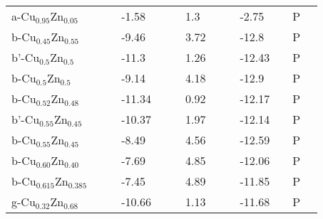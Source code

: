 \begin{landscape}
\begin{center}
\begin{longtable}{|l|p{2.5cm}|l|p{2.5cm}|l|l|p{2.5cm}|l|l|p{2.5cm}|l|l|l|}
a-Cu$_{0.95}$Zn$_{0.05 }$   &            &                     & -1.58   &  & \citep{KubaschewskiCatterallJohnAshley.1956} & 1.3    &  & \citep{KubaschewskiCatterallJohnAshley.1956} & -2.75   &  & P                    \\
b-Cu$_{0.45}$Zn$_{0.55 }$   &            &                     & -9.46   &  & \citep{KubaschewskiCatterallJohnAshley.1956} & 3.72   &  & \citep{KubaschewskiCatterallJohnAshley.1956} & -12.8   &  & P                    \\
b'-Cu$_{0.5}$Zn$_{0.5 }$    &            &                     & -11.3   &  & \citep{KubaschewskiCatterallJohnAshley.1956} & 1.26   &  & \citep{KubaschewskiCatterallJohnAshley.1956} & -12.43  &  & P                    \\
b-Cu$_{0.5}$Zn$_{0.5 }$     &            &                     & -9.14   &  & \citep{KubaschewskiCatterallJohnAshley.1956} & 4.18   &  & \citep{KubaschewskiCatterallJohnAshley.1956} & -12.9   &  & P                    \\
b-Cu$_{0.52}$Zn$_{0.48 }$   &            &                     & -11.34  &  & \citep{KubaschewskiCatterallJohnAshley.1956} & 0.92   &  & \citep{KubaschewskiCatterallJohnAshley.1956} & -12.17  &  & P                    \\
b'-Cu$_{0.55}$Zn$_{0.45}$   &            &                     & -10.37  &  & \citep{KubaschewskiCatterallJohnAshley.1956} & 1.97   &  & \citep{KubaschewskiCatterallJohnAshley.1956} & -12.14  &  & P                    \\
b-Cu$_{0.55}$Zn$_{0.45 }$   &            &                     & -8.49   &  & \citep{KubaschewskiCatterallJohnAshley.1956} & 4.56   &  & \citep{KubaschewskiCatterallJohnAshley.1956} & -12.59  &  & P                    \\
b-Cu$_{0.60}$Zn$_{0.40}$    &            &                     & -7.69   &  & \citep{KubaschewskiCatterallJohnAshley.1956} & 4.85   &  & \citep{KubaschewskiCatterallJohnAshley.1956} & -12.06  &  & P                    \\
b-Cu$_{0.615}$Zn$_{0.385 }$ &            &                     & -7.45   &  & \citep{KubaschewskiCatterallJohnAshley.1956} & 4.89   &  & \citep{KubaschewskiCatterallJohnAshley.1956} & -11.85  &  & P                    \\
g-Cu$_{0.32}$Zn$_{0.68}$    &            &                     & -10.66  &  & \citep{KubaschewskiCatterallJohnAshley.1956} & 1.13   &  & \citep{KubaschewskiCatterallJohnAshley.1956} & -11.68  &  & P                    \\

\end{longtable}
\end{center}
\end{landscape}
